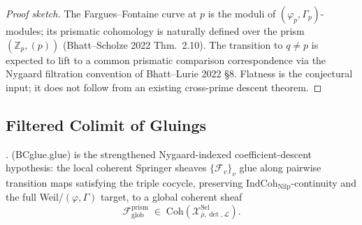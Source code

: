 \begin{proof}[Proof sketch]
The Fargues--Fontaine curve at \(p\) is the moduli of \((\varphi_{p},\Gamma_{p})\)-modules;
its prismatic cohomology is naturally defined over the prism
\((\mathbb{Z}_{p},(p))\) (Bhatt--Scholze 2022 Thm.~2.10). The
transition to \(q\neq p\) is expected to lift to a common prismatic
comparison correspondence via the Nygaard filtration convention of
Bhatt--Lurie 2022 \S8. Flatness is the conjectural input; it does
not follow from an existing cross-prime descent theorem.
\end{proof}

\subsection{Filtered Colimit of Gluings}

\begin{theorem}
\label{v4-arith:bcglue-k5:thm:prismatic-gluing}
\ClaimStatusConjectured. (BCglue.glue) is the strengthened
Nygaard-indexed coefficient-descent hypothesis: the local coherent
Springer sheaves \(\{\mathcal{F}_{v}\}_{v}\) glue along pairwise
transition maps satisfying the triple cocycle, preserving
\(\mathrm{IndCoh}_{\mathrm{Nilp}}\)-continuity and the full
Weil/\((\varphi,\Gamma)\) target, to a global coherent
sheaf
\[
\mathcal{F}_{\mathrm{glob}}^{\mathrm{prism}}\;\in\;\mathrm{Coh}(\mathcal{X}^{\mathrm{Sel}}_{\bar\rho,\det,\mathcal{L}}).
\]
\end{theorem}

